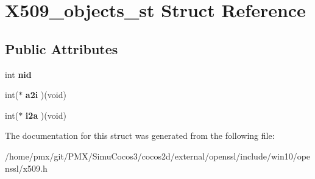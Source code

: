 \hypertarget{structX509__objects__st}{}\section{X509\+\_\+objects\+\_\+st Struct Reference}
\label{structX509__objects__st}
\subsection*{Public Attributes}
\begin{DoxyCompactItemize}
\item 
\mbox{\label{structX509__objects__st_a8f3f79c1037e355813b601c2c9c4d019}} 
int {\bfseries nid}
\item 
\mbox{\label{structX509__objects__st_a6b2bfa8ee8cf1a8acc1add5d1f3940ef}} 
int($\ast$ {\bfseries a2i} )(void)
\item 
\mbox{\label{structX509__objects__st_a7e32841a9585320493acee913eb32ae6}} 
int($\ast$ {\bfseries i2a} )(void)
\end{DoxyCompactItemize}


The documentation for this struct was generated from the following file\+:\begin{DoxyCompactItemize}
\item 
/home/pmx/git/\+P\+M\+X/\+Simu\+Cocos3/cocos2d/external/openssl/include/win10/openssl/x509.\+h\end{DoxyCompactItemize}
